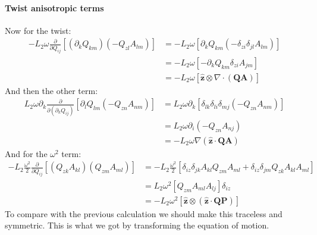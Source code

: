 \documentclass[reqno]{article}
\newcommand{\Q}{\mathbf{Q}}
\newcommand{\bP}{\mathbf{P}}
\newcommand{\A}{\mathbf{A}}
\newcommand{\z}{\mathbf{\hat{z}}}
\begin{document}
\paragraph{Twist anisotropic terms}

Now for the twist:
\begin{equation}
\begin{split}
    -L_2 \omega \frac{\partial}{\partial Q_{ij}} \left[
        (\partial_k Q_{km})(- Q_{zl} A_{lm})
    \right] 
    &=
    -L_2 \omega \left[
        \partial_k Q_{km} \left( 
            - \delta_{zi} \delta_{jl} A_{lm}
        \right)
    \right] \\
    &=
    -L_2 \omega \left[
        - \partial_k Q_{km} \delta_{zi} A_{jm}
    \right] \\
    &=
    -L_2 \omega \left[
        \z \otimes \nabla \cdot \left( \Q \A \right)
    \right]
\end{split}
\end{equation}
And then the other term:
\begin{equation}
\begin{split}
    L_2 \omega 
    \partial_k \frac{\partial}{\partial \left( \partial_k Q_{ij} \right)}
    \left[
        \partial_l Q_{lm} \left(
            - Q_{zn} A_{nm}
        \right)
    \right]
    &=
    L_2 \omega \partial_k \left[
        \delta_{lk} \delta_{li} \delta_{mj}\left(
            - Q_{zn} A_{nm}
        \right)
    \right] \\
    &=
    L_2 \omega \partial_i \left(
            - Q_{zn} A_{nj}
    \right) \\
    &=
    -L_2 \omega \nabla \left( \z \cdot \Q \A \right)
\end{split}
\end{equation}
And for the $\omega^2$ term:
\begin{equation}
\begin{split}
    -L_2 \frac{\omega^2}{2} \frac{\partial}{\partial Q_{ij}}
    \left[
        \left(Q_{zk} A_{kl} \right) \left( Q_{zm} A_{ml} \right)
    \right]
    &=
    -L_2 \frac{\omega^2}{2} \left[
        \delta_{iz} \delta_{jk} A_{kl} Q_{zm} A_{ml}
        + \delta_{iz} \delta_{jm} Q_{zk}A_{kl} A_{ml}
    \right] \\
    &=
    L_2 \omega^2 \left[
        Q_{zm} A_{ml} A_{lj}
    \right] \delta_{iz} \\
    &=
    -L_2 \omega^2 \left[
        \z \otimes \left( \z \cdot \Q \bP \right)
    \right]
\end{split}
\end{equation}
To compare with the previous calculation we should make this traceless and symmetric.
This is what we got by transforming the equation of motion.
\end{document}
